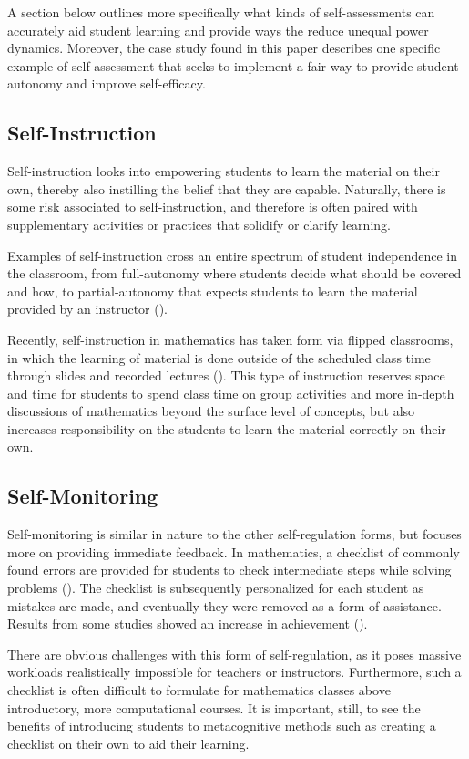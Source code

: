 A section below outlines more specifically what kinds of self-assessments can accurately aid student learning and provide ways the reduce unequal power dynamics. Moreover, the case study found in this paper describes one specific example of self-assessment that seeks to implement a fair way to provide student autonomy and improve self-efficacy.

\subsection{Self-Instruction}
Self-instruction looks into empowering students to learn the material on their own, thereby also instilling the belief that they are capable. Naturally, there is some risk associated to self-instruction, and therefore is often paired with supplementary activities or practices that solidify or clarify learning.

Examples of self-instruction cross an entire spectrum of student independence in the classroom, from full-autonomy where students decide what should be covered and how, to partial-autonomy that expects students to learn the material provided by an instructor (\cite{burris_developmental_1972}).

Recently, self-instruction in mathematics has taken form via flipped classrooms, in which the learning of material is done outside of the scheduled class time through slides and recorded lectures (\cite{lage_inverting_2000}). This type of instruction reserves space and time for students to spend class time on group activities and more in-depth discussions of mathematics beyond the surface level of concepts, but also increases responsibility on the students to learn the material correctly on their own.

\subsection{Self-Monitoring}
Self-monitoring is similar in nature to the other self-regulation forms, but focuses more on providing immediate feedback. In mathematics, a checklist of commonly found errors are provided for students to check intermediate steps while solving problems (\cite{dunlap_custom}). The checklist is subsequently personalized for each student as mistakes are made, and eventually they were removed as a form of assistance. Results from some studies showed an increase in achievement (\cite{dunlap_ld}).

There are obvious challenges with this form of self-regulation, as it  poses massive workloads realistically impossible for teachers or instructors. Furthermore, such a checklist is often difficult to formulate for mathematics classes above introductory, more computational courses. It is important, still, to see the benefits of introducing students to metacognitive methods such as creating a checklist on their own to aid their learning.

